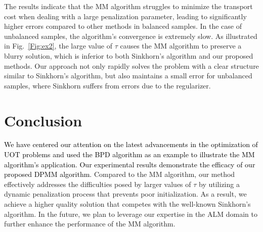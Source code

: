 \documentclass[conference]{IEEEtran}
\newcommand{\changeSX}[1]{\textcolor{black}{#1}}
\begin{document}
The results indicate that the MM algorithm struggles to minimize the transport cost when dealing with a large penalization parameter, leading to significantly higher errors compared to other methods in balanced samples. In the case of unbalanced samples, the algorithm's convergence is extremely slow. As illustrated in Fig.~\ref{Fig:ex2}, the large value of $\tau$ causes the MM algorithm to preserve a blurry solution, which is inferior to both Sinkhorn's algorithm and our proposed methods. Our approach not only rapidly solves the problem with a clear structure similar to Sinkhorn's algorithm, but also maintains a small error for unbalanced samples, where Sinkhorn suffers from errors due to the regularizer.



\section{Conclusion}
\changeSX{We have centered our attention on the latest advancements in the optimization of UOT problems and used the BPD algorithm as an example to illustrate the MM algorithm's application. Our experimental results demonstrate the efficacy of our proposed DPMM algorithm.} Compared to the MM algorithm, our method effectively addresses the difficulties posed by larger values of $\tau$ by utilizing a dynamic penalization process that prevents poor initialization. As a result, we achieve a higher quality solution that competes with the well-known Sinkhorn's algorithm. In the future, we plan to leverage our expertise in the ALM domain to further enhance the performance of the MM algorithm.



\clearpage


\color{red}
\end{document}
